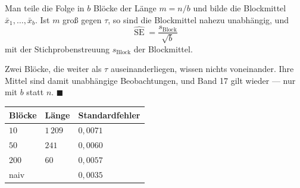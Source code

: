 \begin{merksatz}
Man teile die Folge in $b$ Blöcke der Länge $m = n/b$ und bilde die Blockmittel $\bar x_1,\ldots,\bar x_b$. Ist $m$ groß gegen $\tau$, so sind die Blockmittel nahezu unabhängig, und
\[ \widehat{\operatorname{SE}} = \frac{s_{\text{Block}}}{\sqrt b} \]
mit der Stichprobenstreuung $s_{\text{Block}}$ der Blockmittel.

Zwei Blöcke, die weiter als $\tau$ auseinanderliegen, wissen nichts voneinander. Ihre Mittel sind damit unabhängige Beobachtungen, und Band 17 gilt wieder --- nur mit $b$ statt $n$. $\blacksquare$

\begin{center}
{\small
\renewcommand{\arraystretch}{1.48}
\begin{tabular}{@{}P{1.8cm}P{2.0cm}P{2.4cm}@{}}
\toprule
\textbf{Blöcke} & \textbf{Länge} & \textbf{Standardfehler}\\
\midrule
$10$ & $1\,209$ & $0{,}0071$\\
$50$ & $241$ & $0{,}0060$\\
$200$ & $60$ & $0{,}0057$\\
\midrule
naiv & & $0{,}0035$\\
\bottomrule
\end{tabular}}
\end{center}

\begin{center}
\begin{minipage}{0.88\textwidth}
\end{minipage}
\end{center}
\end{merksatz}

